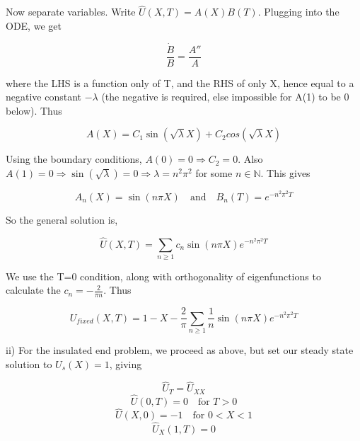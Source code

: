 \documentclass[10pt,a4paper]{report}
\begin{document}
Now separate variables. Write $\hat{U}(X,T)=A(X)B(T)$. Plugging into the ODE, we get

\begin{equation*}
\frac{\dot{B}}{B}=\frac{A''}{A}
\end{equation*}

where the LHS is a function only of T, and the RHS of only X, hence equal to a negative constant $-\lambda$ (the negative is required, else impossible for A(1) to be 0 below). Thus 

\begin{equation*}
A(X)=C_1\sin(\sqrt{\lambda}X)+C_2cos(\sqrt{\lambda}X)
\end{equation*}

Using the boundary conditions, $A(0)=0\Rightarrow C_2=0$. Also $A(1)=0\Rightarrow \sin(\sqrt{\lambda})=0 \Rightarrow \lambda=n^2\pi^2$ for some $n\in\mathbb{N}$. This gives

\begin{equation*}
A_n(X)=\sin(n\pi X) \quad \text{and} \quad B_n(T)=e^{-n^2\pi^2 T}
\end{equation*}

So the general solution is,

\begin{equation*}
\hat{U}(X,T)=\sum_{n\geq 1} c_n \sin(n\pi X) e^{-n^2\pi^2 T}
\end{equation*}

We use the T=0 condition, along with orthogonality of eigenfunctions to calculate the $c_n=-\frac{2}{\pi n}$. Thus 

\begin{equation*}
U_{fixed}(X,T)=1-X-\frac{2}{\pi}\sum_{n\geq 1} \frac{1}{n}\sin(n\pi X) e^{-n^2\pi^2 T}
\end{equation*}

\vspace{1cm}

ii) For the insulated end problem, we proceed as above, but set our steady state solution to $U_s(X)=1$, giving 

\begin{equation*}
\hat{U}_T=\hat{U}_{XX} 
\end{equation*}
\begin{equation*}
\hat{U}(0,T)=0 \quad \text{for }T>0
\end{equation*}
\begin{equation*}
\hat{U}(X,0)=-1 \quad \text{for }0<X<1
\end{equation*}
\begin{equation*}
\hat{U}_X(1,T)=0 
\end{equation*}
\end{document}
